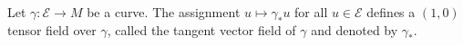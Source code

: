 Let $\gamma: \mathcal{E} \rightarrow M$ be a curve. The assignment $u \mapsto \gamma_*u$ for all $u \in \mathcal{E}$ defines a $(1,0)$ tensor field over $\gamma$, called the tangent vector field of $\gamma$ and denoted by $\gamma_*$.
